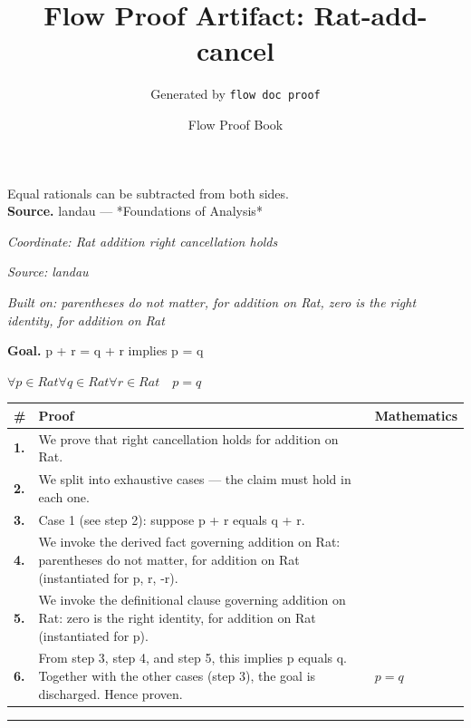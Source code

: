 \documentclass[11pt]{article}
\title{Flow Proof Artifact: Rat-add-cancel}
\author{Generated by \texttt{flow doc proof}}
\date{Flow Proof Book}
\theoremstyle{definition}
\begin{document}
\maketitle
Equal rationals can be subtracted from both sides.\\[0.5em]
\textbf{Source.} landau — *Foundations of Analysis*\\[0.5em]
\bigskip
{}\par
\smallskip\noindent\textit{Coordinate: Rat \cdot addition \cdot right cancellation holds}\par
\smallskip\noindent\textit{Source: landau}\par
\smallskip\noindent\textit{Built on: parentheses do not matter, for addition on Rat, zero is the right identity, for addition on Rat}\par
\medskip
\noindent\textbf{Goal.} p + r = q + r implies p = q\par
\noindent$\displaystyle \forall p \in Rat \forall q \in Rat \forall r \in Rat\quad p = q$\par
\medskip
\noindent
\begin{tabular}{@{} >{\raggedright\arraybackslash}p{} >{\raggedright\arraybackslash}p{} >{\raggedleft\arraybackslash}p{} @{}}
\textbf{\#} & \textbf{Proof} & \textbf{Mathematics} \\
\midrule
\textbf{1.} & We prove that right cancellation holds for addition on Rat. & \\[0.45em]
\textbf{2.} & We split into exhaustive cases — the claim must hold in each one. & \\[0.45em]
\textbf{3.} & Case 1 (see step 2): suppose p + r  equals  q + r. & \\[0.45em]
\textbf{4.} & We invoke the derived fact governing addition on Rat: parentheses do not matter, for addition on Rat (instantiated for p, r, -r). & \\[0.45em]
\textbf{5.} & We invoke the definitional clause governing addition on Rat: zero is the right identity, for addition on Rat (instantiated for p). & \\[0.45em]
\textbf{6.} & From step 3, step 4, and step 5, this implies p equals q. Together with the other cases (step 3), the goal is discharged. Hence proven. & $\displaystyle p = q$ \\[0.45em]
\bottomrule
\end{tabular}
\label{thm:Rat-addition-right_cancellation_holds}
\par\medskip\hrule
\end{document}

